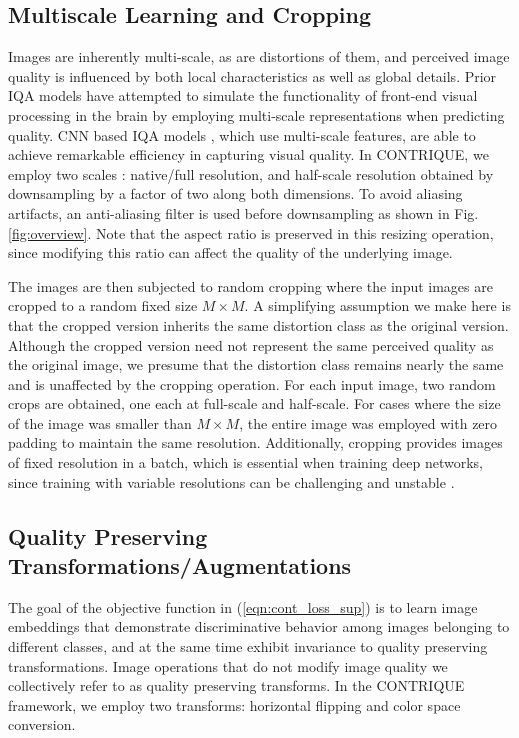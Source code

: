 \documentclass[journal]{IEEEtran}
\begin{document}
\subsection{Multiscale Learning and Cropping}
Images are inherently multi-scale, as are distortions of them, and perceived image quality is influenced by both local characteristics as well as global details. Prior IQA models \cite{wang2003multiscale,moorthy2011blind,mittal2012no,mittal2013making} have attempted to simulate the functionality of front-end visual processing in the brain by employing multi-scale representations when predicting quality. CNN based IQA models \cite{zhang2018unreasonable,su2020blindly}, which use multi-scale features, are able to achieve remarkable efficiency in capturing visual quality. In CONTRIQUE, we employ two scales : native/full resolution, and half-scale resolution obtained by downsampling by a factor of two along both dimensions. To avoid aliasing artifacts, an anti-aliasing filter is used before downsampling as shown in Fig. \ref{fig:overview}. Note that the aspect ratio is preserved in this resizing operation, since modifying this ratio can affect the quality of the underlying image.

The images are then subjected to random cropping where the input images are cropped to a random fixed size $M \times M$. A simplifying assumption we make here is that the cropped version inherits the same distortion class as the original version. Although the cropped version need not represent the same perceived quality as the original image, we presume that the distortion class remains nearly the same and is unaffected by the cropping operation. For each input image, two random crops are obtained, one each at full-scale and half-scale. For cases where the size of the image was smaller than $M \times M$, the entire image was employed with zero padding to maintain the same resolution. Additionally, cropping provides images of fixed resolution in a batch, which is essential when training deep networks, since training with variable resolutions can be challenging and unstable \cite{ying2019patches}.

\subsection{Quality Preserving Transformations/Augmentations}
\label{sec:transform}
The goal of the objective function in (\ref{eqn:cont_loss_sup}) is to learn image embeddings that demonstrate discriminative behavior among images belonging to different classes, and at the same time exhibit invariance to quality preserving transformations. Image operations that do not modify image quality we collectively refer to as quality preserving transforms. In the CONTRIQUE framework, we employ two transforms: horizontal flipping and color space conversion. 
\end{document}
